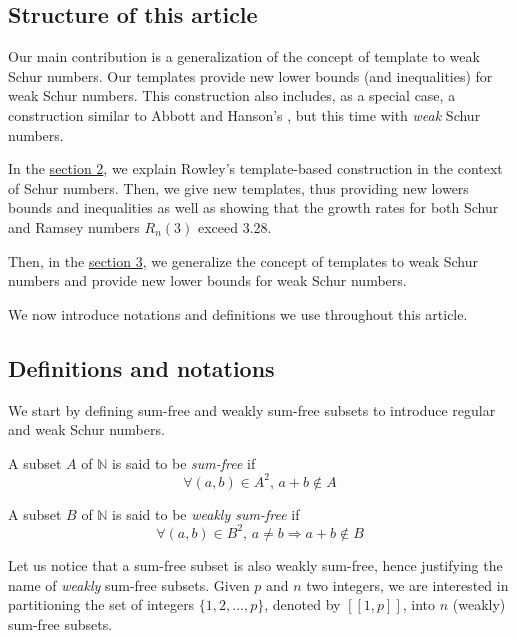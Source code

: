\subsection{Structure of this article}

\qquad Our main contribution is a generalization of the concept of template to weak Schur numbers. 
Our templates provide new lower bounds (and inequalities) for weak Schur numbers. This construction also includes, 
as a special case, a construction similar to Abbott and Hanson's \cite{AbbottHanson}, but this time with 
\textit{weak} Schur numbers.

\par
In the \hyperref[Schur]{section 2}, we explain Rowley's template-based construction in the context of 
Schur numbers. Then, we give new templates, thus providing new lowers bounds and inequalities as well as 
showing that the growth rates for both Schur and Ramsey numbers \(R_n(3)\) exceed 3.28. 

\par
Then, in the \hyperref[WeakSchur]{section 3}, we generalize the concept of templates to weak Schur numbers 
and provide new lower bounds for weak Schur numbers. 

\par
We now introduce notations and definitions we use throughout this article.

\subsection{Definitions and notations}

\qquad We start by defining sum-free and weakly sum-free subsets to introduce regular and weak Schur numbers.

\begin{definition}
A subset \(A\) of \(\mathbb{N}\) is said to be \textit{sum-free} if
\[ \forall (a,b) \in A^2 \text{, } a+b \notin A\]
\end{definition}

\begin{definition}
A subset \(B\) of \(\mathbb{N}\) is said to be \textit{weakly sum-free} if
\[ \forall (a,b) \in B^2 \text{, } a \neq b \Longrightarrow a+b \notin B\]
\end{definition}

Let us notice that a sum-free subset is also weakly sum-free, hence justifying the name of \textit{weakly} sum-free
subsets. Given \(p\) and \(n\) two integers, we are interested in partitioning the set of integers \(\{1, 2, ..., p\}\), 
denoted by \([\![1,p]\!]\), into \(n\) (weakly) sum-free subsets.

